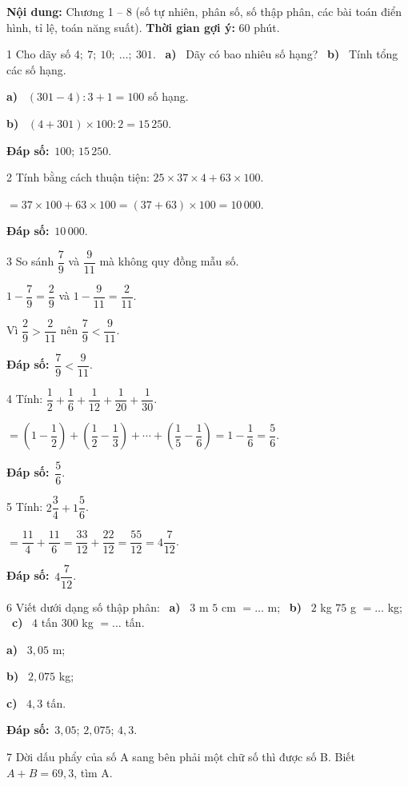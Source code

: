 \documentclass[11pt]{article}
\newif\ifsol \solfalse
\providecommand{\AnsWord}{Đáp số}
\newcommand{\dapso}[1]{\par\textbf{\AnsWord:}\ #1}
\newcommand{\probsol}[1]{%
  \begin{lrbox}{\solmeasure}\begin{minipage}{\dimexpr\linewidth-24pt\relax}#1\end{minipage}\end{lrbox}%
  \ifsol
    \begin{solbox}#1\end{solbox}%
  \else
    \setlength{\solht}{\dimexpr\ht\solmeasure+\dp\solmeasure+0.85cm\relax}%
    \ifdim\solht<1.35cm\setlength{\solht}{1.35cm}\fi
    \begin{tcolorbox}[colback=white,colframe=Line,boxrule=0.8pt,arc=5pt,
      left=8pt,right=8pt,top=4pt,bottom=4pt,height=\solht]{\footnotesize\color{Slate}\itshape\WorkWord}\end{tcolorbox}%
  \fi}
\newcommand{\pa}[1]{\textbf{#1)}\ }
\newcommand{\gap}{\vspace{0.3cm}}
\def\WorkWord{Bài làm:}
\def\AnsWord{Đáp số}
\begin{document}
\begin{knowbox}
\textbf{Nội dung:} Chương 1 -- 8 (số tự nhiên, phân số, số thập phân, các bài toán điển hình, tỉ lệ, toán năng suất). \quad \textbf{Thời gian gợi ý:} $60$ phút.
\end{knowbox}
\gap
\begin{probbox}{1}{\relax}
Cho dãy số $4;\ 7;\ 10;\ \ldots;\ 301$. \ \pa{a} Dãy có bao nhiêu số hạng? \ \pa{b} Tính tổng các số hạng.
\end{probbox}
\probsol{
\pa{a} $(301-4):3+1=100$ số hạng.\par \pa{b} $(4+301)\times100:2=15\,250$.
\dapso{$100$; $15\,250$.}}
\gap
\begin{probbox}{2}{\relax}
Tính bằng cách thuận tiện: $25\times37\times4+63\times100$.
\end{probbox}
\probsol{
$=37\times100+63\times100=(37+63)\times100=10\,000$.
\dapso{$10\,000$.}}
\gap
\begin{probbox}{3}{\relax}
So sánh $\dfrac79$ và $\dfrac9{11}$ mà không quy đồng mẫu số.
\end{probbox}
\probsol{
$1-\dfrac79=\dfrac29$ và $1-\dfrac9{11}=\dfrac2{11}$.\par Vì $\dfrac29>\dfrac2{11}$ nên $\dfrac79<\dfrac9{11}$.
\dapso{$\dfrac79<\dfrac9{11}$.}}
\gap
\begin{probbox}{4}{\relax}
Tính: $\dfrac12+\dfrac16+\dfrac1{12}+\dfrac1{20}+\dfrac1{30}$.
\end{probbox}
\probsol{
$=\left(1-\dfrac12\right)+\left(\dfrac12-\dfrac13\right)+\cdots+\left(\dfrac15-\dfrac16\right)=1-\dfrac16=\dfrac56$.
\dapso{$\dfrac56$.}}
\gap
\begin{probbox}{5}{\relax}
Tính: $2\dfrac34+1\dfrac56$.
\end{probbox}
\probsol{
$=\dfrac{11}4+\dfrac{11}6=\dfrac{33}{12}+\dfrac{22}{12}=\dfrac{55}{12}=4\dfrac7{12}$.
\dapso{$4\dfrac7{12}$.}}
\gap
\begin{probbox}{6}{\relax}
Viết dưới dạng số thập phân: \ \pa{a} $3$ m $5$ cm $=\ldots$ m; \ \pa{b} $2$ kg $75$ g $=\ldots$ kg; \ \pa{c} $4$ tấn $300$ kg $=\ldots$ tấn.
\end{probbox}
\probsol{
\pa{a} $3{,}05$ m;\par \pa{b} $2{,}075$ kg;\par \pa{c} $4{,}3$ tấn.
\dapso{$3{,}05$; $2{,}075$; $4{,}3$.}}
\gap
\begin{probbox}{7}{\relax}
Dời dấu phẩy của số A sang bên phải một chữ số thì được số B. Biết $A+B=69{,}3$, tìm A.
\end{probbox}
\end{document}

